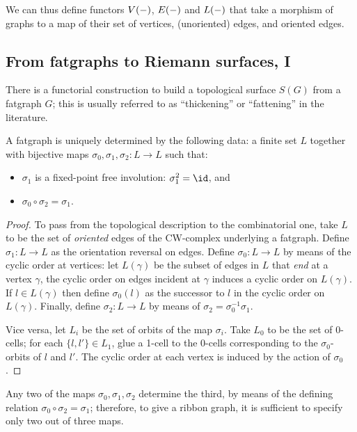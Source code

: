 We can thus define functors $V(-)$, $E(-)$ and $L(-)$
that take a morphism of graphs to a map of their set of vertices,
(unoriented) edges, and oriented edges.

\subsection{From fatgraphs to Riemann surfaces, I}
\label{sec:rg-to-surfaces}

There is a functorial construction to build a topological surface
$S(G)$ from a fatgraph $G$; this is usually referred to as
``thickening'' or ``fattening'' in the literature.

\begin{lemma}
  A fatgraph is uniquely determined by the following data: a
  finite set $L$ together with bijective maps $\sigma_0, \sigma_1, \sigma_2: L \to L$ such
  that:
  \begin{itemize}
  \item $\sigma_1$ is a fixed-point free involution: $\sigma_1^2 = \id$, and
  \item $\sigma_0 \circ \sigma_2 = \sigma_1$.
  \end{itemize}
\end{lemma}
\begin{proof}
  To pass from the topological description to the combinatorial one,
  take $L$ to be the set of \emph{oriented} edges of the CW-complex
  underlying a fatgraph.  Define $\sigma_1:L\to L$ as the orientation
  reversal on edges.  Define $\sigma_0:L\to L$ by means of the cyclic order
  at vertices: let $L(\gamma)$ be the subset of edges in $L$ that
  \emph{end} at a vertex $\gamma$, the cyclic order on edges incident at
  $\gamma$ induces a cyclic order on $L(\gamma)$.  If $l\in L(\gamma)$ then
  define $\sigma_0(l)$ as the successor to $l$ in the cyclic order on
  $L(\gamma)$.  Finally, define $\sigma_2: L \to L$ by means of
  $\sigma_2=\sigma_0^{-1}\sigma_1$.

  Vice versa, let $L_i$ be the set of orbits of the map $\sigma_i$.  Take
  $L_0$ to be the set of 0-cells; for each $\{l,l'\} \in L_1$, glue a
  1-cell to the 0-cells corresponding to the $\sigma_0$-orbits of $l$ and
  $l'$.  The cyclic order at each vertex is induced by the action of
  $\sigma_0$.
\end{proof}
Any two of the maps $\sigma_0, \sigma_1, \sigma_2$ determine the third, by means of
the defining relation $\sigma_0 \circ \sigma_2 = \sigma_1$; therefore, to give a ribbon
graph, it is sufficient to specify only two out of three maps.

